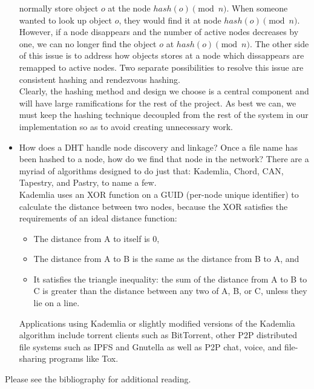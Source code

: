 \documentclass[12pt]{report}
\begin{document}
\begin{itemize}
            normally store object $o$ at the node $hash(o) \pmod n$.  When
            someone wanted to look up object $o$, they would find it at node
            $hash(o) \pmod n$.  However, if a node disappears and the number of
            active nodes decreases by one, we can no longer find the object $o$
            at $hash(o) \pmod n$.  The other side of this issue is to address how
            objects stores at a node which dissappears are remapped to active
            nodes.  Two separate possibilities to resolve this issue are
            consistent hashing and rendezvous hashing.\\
            Clearly, the hashing method and design we choose is a central
            component and will have large ramifications for the rest of the
            project.  As best we can, we must keep the hashing technique
            decoupled from the rest of the system in our implementation so as to
            avoid creating unnecessary work.

        \item How does a DHT handle node discovery and linkage? Once a file name
            has been hashed to a node, how do we find that node in the network?
            There are a myriad of algorithms designed to do just that:
            Kademlia\cite{kademlia}, Chord\cite{chord}, CAN,
            Tapestry\cite{tapestry}, and
            Pastry\cite{pastry}, to name a few.\\
            Kademlia uses an XOR function on a GUID (per-node unique identifier)
            to calculate the distance between two nodes, because the XOR
            satisfies the requirements of an ideal distance function:
            \begin{itemize}
                \item The distance from A to itself is 0,
                \item The distance from A to B is the same as the distance from
                    B to A, and
                \item It satisfies the triangle inequality: the sum of the
                    distance from A to B to C is greater than the distance
                    between any two of A, B, or C, unless they lie on a line.
            \end{itemize}
            Applications using Kademlia or slightly modified versions of the
            Kademlia algorithm include torrent clients such as BitTorrent, other
            P2P distributed file systems such as IPFS and Gnutella as well as
            P2P chat, voice, and file-sharing programs like Tox.
    \end{itemize}

    Please see the bibliography for additional reading.
	
    \pagebreak

\nocite{*}
\printbibliography
\end{document}
